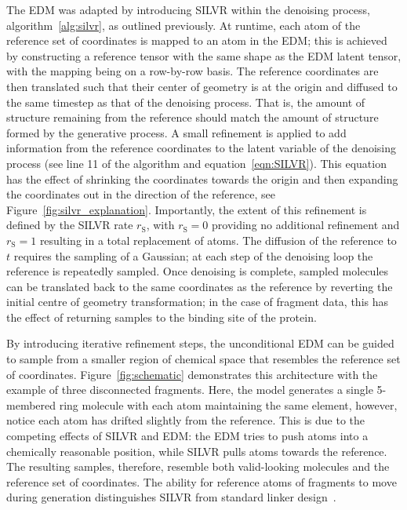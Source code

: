 \documentclass[journal=jacsat,manuscript=article]{achemso}
\begin{document}
The EDM was adapted by introducing SILVR within the denoising process, algorithm~\ref{alg:silvr}, as outlined previously. At runtime, each atom of the reference set of coordinates is mapped to an atom in the EDM; this is achieved by constructing a reference tensor with the same shape as the EDM latent tensor, with the mapping being on a row-by-row basis. The reference coordinates are then translated such that their center of geometry is at the origin and diffused to the same timestep as that of the denoising process. That is, the amount of structure remaining from the reference should match the amount of structure formed by the generative process. A small refinement is applied to add information from the reference coordinates to the latent variable of the denoising process (see line 11 of the algorithm and equation~\ref{eqn:SILVR}). This equation has the effect of shrinking the coordinates towards the origin and then expanding the coordinates out in the direction of the reference, see Figure~\ref{fig:silvr_explanation}. Importantly, the extent of this refinement is defined by the SILVR rate $r_{\mathrm{S}}$, with $r_{\mathrm{S}}=0$ providing no additional refinement and $r_{\mathrm{S}}=1$ resulting in a total replacement of atoms. The diffusion of the reference to $t$ requires the sampling of a Gaussian; at each step of the denoising loop the reference is repeatedly sampled.  Once denoising is complete, sampled molecules can be translated back to the same coordinates as the reference by reverting the initial centre of geometry transformation; in the case of fragment data, this has the effect of returning samples to the binding site of the protein.

By introducing iterative refinement steps, the unconditional EDM can be guided to sample from a smaller region of chemical space that resembles the reference set of coordinates. Figure~\ref{fig:schematic} demonstrates this architecture with the example of three disconnected fragments. Here, the model generates a single 5-membered ring molecule with each atom maintaining the same element, however, notice each atom has drifted slightly from the reference. This is due to the competing effects of SILVR and EDM: the EDM tries to push atoms into a chemically reasonable position, while SILVR pulls atoms towards the reference. The resulting samples, therefore, resemble both valid-looking molecules and the reference set of coordinates. The ability for reference atoms of fragments to move during generation distinguishes SILVR from standard linker design~\cite{guo2023linkinvent, igashov2022equivariant}.
\end{document}
